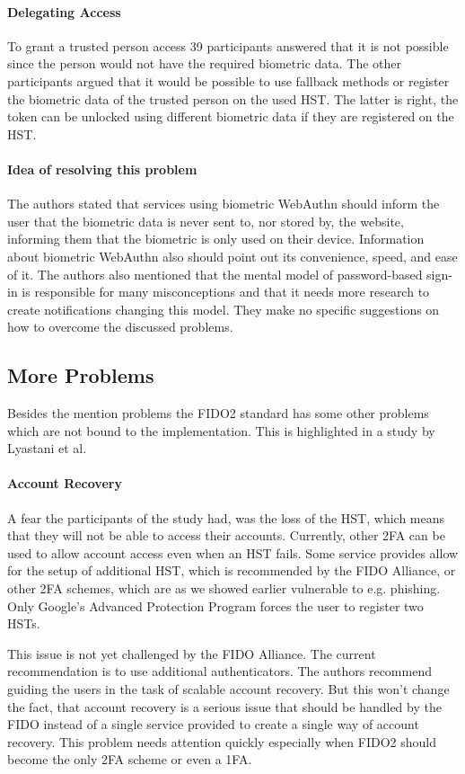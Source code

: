 \documentclass[runningheads]{llncs}
\begin{document}
\paragraph{Delegating Access}
To grant a trusted person access 39 participants answered that it is not possible since the person would not have the required biometric data. The other participants argued that it would be possible to use fallback methods or register the biometric data of the trusted person on the used HST. The latter is right, the token can be unlocked using different biometric data if they are registered on the HST.

\paragraph{Idea of resolving this problem}
The authors stated that services using biometric WebAuthn should inform the user that the biometric data is never sent to, nor stored by, the website, informing them that the biometric is only used on their device. Information about biometric WebAuthn also should point out its convenience, speed, and ease of it. The authors also mentioned that the mental model of password-based sign-in is responsible for many misconceptions and that it needs more research to create notifications changing this model. They make no specific suggestions on how to overcome the discussed problems.

\subsection{More Problems} \label{ref1}
Besides the mention problems the FIDO2 standard has some other problems which are not bound to the implementation. This is highlighted in a study by Lyastani et al. \cite{9152694}

\paragraph{Account Recovery}
A fear the participants of the study had, was the loss of the HST, which means that they will not be able to access their accounts. Currently, other 2FA can be used to allow account access even when an HST fails. Some service provides allow for the setup of additional HST, which is recommended by the FIDO Alliance, or other 2FA schemes, which are as we showed earlier vulnerable to e.g. phishing. Only Google's Advanced Protection Program forces the user to register two HSTs.

This issue is not yet challenged by the FIDO Alliance. The current recommendation is to use additional authenticators. The authors recommend guiding the users in the task of scalable account recovery. But this won't change the fact, that account recovery is a serious issue that should be handled by the FIDO instead of a single service provided to create a single way of account recovery. This problem needs attention quickly especially when FIDO2 should become the only 2FA scheme or even a 1FA. 
\end{document}
